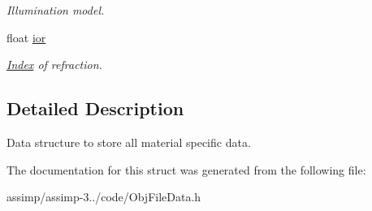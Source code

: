 \begin{DoxyCompactItemize}
\begin{DoxyCompactList}\small\item\em Illumination model. \end{DoxyCompactList}\item 
\hypertarget{struct_assimp_1_1_obj_file_1_1_material_a9dc6a44f9ce0966a16e5a43b4c4d01c4}{float \hyperlink{struct_assimp_1_1_obj_file_1_1_material_a9dc6a44f9ce0966a16e5a43b4c4d01c4}{ior}}\label{struct_assimp_1_1_obj_file_1_1_material_a9dc6a44f9ce0966a16e5a43b4c4d01c4}

\begin{DoxyCompactList}\small\item\em \hyperlink{struct_index}{Index} of refraction. \end{DoxyCompactList}\end{DoxyCompactItemize}


\subsection{Detailed Description}
Data structure to store all material specific data. 

The documentation for this struct was generated from the following file\+:\begin{DoxyCompactItemize}
\item 
assimp/assimp-\/3../code/Obj\+File\+Data.\+h\end{DoxyCompactItemize}
